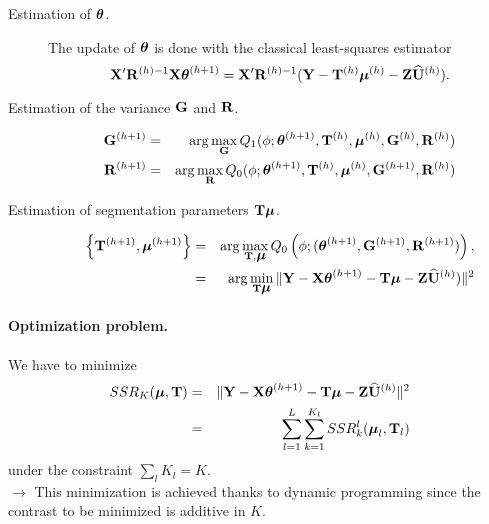 \documentclass[17pt,landscape]{foils}
\newcommand{\mubf}{\mbox{\mathversion{bold}{$\mu$}}}
\newcommand{\thetabf}{\mbox{\mathversion{bold}{$\theta$}}}
\newcommand{\Gbf}{{\bf G}}
\newcommand{\Rbf}{{\bf R}}
\newcommand{\Tbf}{{\bf T}}
\newcommand{\Ubf}{{\bf U}}
\newcommand{\Xbf}{{\bf X}}
\newcommand{\Ybf}{{\bf Y}}
\newcommand{\Zbf}{{\bf Z}}
\begin{document}
\begin{description}
\item[Estimation of $\thetabf$.] The update of $\thetabf$ is done
with the classical least-squares estimator
\begin{equation*}
  \Xbf' \Rbf^{(h)-1} \Xbf \thetabf^{(h+1)} = \Xbf' \Rbf^{(h)-1} (\Ybf
  - \Tbf^{(h)} \mubf^{(h)}- \Zbf \widehat{\Ubf}^{(h)}).
\end{equation*}

\item[Estimation of the variance $\Gbf$ and $\Rbf$.]
\begin{eqnarray*}
\Gbf^{(h+1)}&=&\arg \max_{\Gbf} Q_1 (\phi;
\thetabf^{(h+1)},\Tbf^{(h)},\mubf^{(h)}, \Gbf^{(h)},
\Rbf^{(h)}) \\
\Rbf^{(h+1)}&=&\arg \max_{\Rbf} Q_0 ( \phi; \thetabf^{(h+1)},
\Tbf^{(h)}, \mubf^{(h)}, \Gbf^{(h+1)}, \Rbf^{(h)})
\end{eqnarray*}
\item[Estimation of segmentation parameters $\Tbf \mubf$.]

\begin{eqnarray*}
\left\{ \Tbf^{(h+1)},\mubf^{(h+1)} \right\} & = & \arg
\max_{\Tbf,\mubf} Q_0 \left(\phi;
  (\thetabf^{(h+1)},\Gbf^{(h+1)},\Rbf^{(h+1)})\right),\\
&=& \arg\min_{\Tbf\mubf} \|\Ybf - \Xbf
\thetabf^{(h+1)}-{\Tbf\mubf}-\Zbf \widehat{\Ubf}^{(h)})\|^2
\end{eqnarray*}


\end{description}

\newpage
{}
\foilhead[-.5in]{}

\paragraph{Optimization problem.} We have to minimize
\begin{eqnarray*}
SSR_{K}(\mubf, \Tbf) &=& \| \Ybf-\Xbf \thetabf^{(h+1)} -\Tbf \mubf-
\Zbf \widehat{\Ubf}^{(h)}\|^2\\
& = &  \sum_{l=1}^{L} \sum_{k=1}^{K_l} SSR^l_k(\mubf_l,\Tbf_l)
\end{eqnarray*}
under the constraint $\sum_l K_l=K$. \\

$\rightarrow$ This minimization is achieved thanks to dynamic
programming since the contrast to be minimized is additive in $K$.
\end{document}
